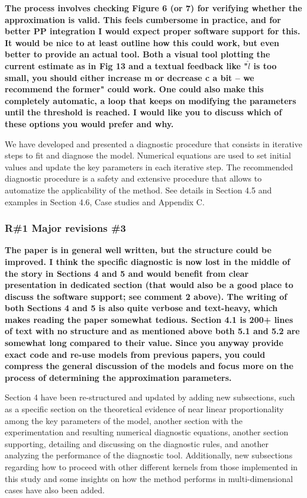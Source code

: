\documentclass[11pt]{report}
\begin{document}
\textbf{The process involves checking Figure 6 (or 7) for verifying whether the approximation is valid. This feels cumbersome in practice, and for better PP integration I would expect proper software support for this. It would be nice to at least outline how this could work, but even better to provide an actual tool. Both a visual tool plotting the current estimate as in Fig 13 and a textual feedback like "$\hat l$ is too small, you should either increase m or decrease c a bit -- we recommend the former" could work. One could also make this completely automatic, a loop that keeps on modifying the parameters until the threshold is reached. I would like you to discuss which of these options you would prefer and why.}

We have developed and presented a diagnostic procedure that consists in iterative steps to fit and diagnose the model. Numerical equations are used to set initial values and update the key parameters in each iterative step. The recommended diagnostic procedure is a safety and extensive procedure that allows to automatize the applicability of the method. See details in Section 4.5 and examples in Section 4.6, Case studies and Appendix C.

\subsubsection*{R\#1 Major revisions \#3}

\textbf{The paper is in general well written, but the structure could be improved. I think the specific diagnostic is now lost in the middle of the story in Sections 4 and 5 and would benefit from clear presentation in dedicated section (that would also be a good place to discuss the software support; see comment 2 above). The writing of both Sections 4 and 5 is also quite verbose and text-heavy, which makes reading the paper somewhat tedious. Section 4.1 is 200+ lines of text with no structure and as mentioned above both 5.1 and 5.2 are somewhat long compared to their value. Since you anyway provide exact code and re-use models from previous papers, you could compress the general discussion of the models and focus more on the process of determining the approximation parameters.}

Section 4 have been re-structured and updated by adding new subsections, such as a specific section on the theoretical evidence of near linear proportionality among the key parameters of the model, another section with the experimentation and resulting numerical diagnostic equations, another section supporting, detailing and discussing on the diagnostic rules, and another analyzing the performance of the diagnostic tool. Additionally, new subsections regarding how to proceed with other different kernels from those implemented in this study and some insights on how the method performs in multi-dimensional cases have also been added.
\end{document}
